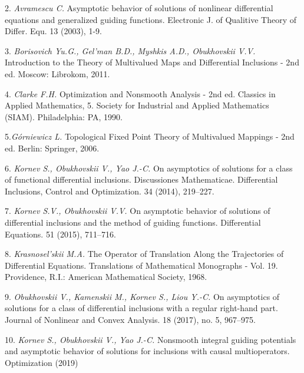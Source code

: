 2.  {\it Avramescu C.} Asymptotic behavior of solutions of nonli\-near differential equations and generalized guiding functions. Elec\-tronic J. of Qualitive Theory of Differ. Equ. 13 (2003), 1-9.

3. {\it Borisovich Yu.G., Gel'man B.D., Myshkis A.D., Obukho\-vskii V.V.} Introduction to the Theory of Multivalued Maps and Dif\-fe\-ren\-tial Inclusions - 2nd ed. Moscow: Librokom, 2011.

4.  {\it Clarke F.H.} Optimization and Nonsmooth Analysis - 2nd ed. Classics in Applied Mathematics, 5. Society for Industrial and Applied Mathematics (SIAM). Philadelphia: PA, 1990.

5.{\it G\'orniewicz L.}  Topological Fixed Point Theory of Multi\-valued Mappings - 2nd ed. Berlin: Springer, 2006.

6. {\it Kornev S., Obukhovskii V., Yao J.-C.} On asymptotics of solutions for a class of functional differential inclusions. Discus\-sio\-nes Mathematicae. Differential Inclusions, Control and Opti\-mi\-zation. 34 (2014), 219--227.

7. {\it Kornev S.V., Obukhovskii V.V.}  On asymptotic behavior of solutions of differential inclusions and the method of guiding functions. Differential Equations. 51 (2015), 711--716.

8.  {\it Krasnosel'skii M.A.} The Operator of Translation Along the Trajectories of Differential Equations. Translations of Mathe\-ma\-tical Monographs - Vol. 19.  Providence, R.I.: American Ma\-the\-matical Society, 1968.

9. {\it Obukhovskii V., Kamenskii M., Kornev S., Liou Y.-C.} On asymptotics of solutions for a class of differential inclusions with a regular right-hand part. Journal of Nonlinear and Convex Analysis. 18 (2017), no. 5, 967--975.

10. {\it Kornev S., Obukhovskii V., Yao J.-C.}  Nonsmooth integral guiding potentials and asymptotic behavior of solutions for inclusions with causal multioperators. Optimization (2019)
